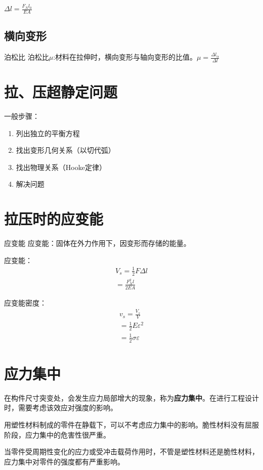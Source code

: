 $\Delta l=\frac{F_Nl_0}{EA}$

\subsection{横向变形}
\begin{mydefinition}{泊松比}
	泊松比$\mu$:材料在拉伸时，横向变形与轴向变形的比值。$\mu=\frac{\Delta l_{\alpha}}{\Delta l}$

\end{mydefinition}


\section{拉、压超静定问题}
一般步骤：
\begin{enumerate}
	\item 列出独立的平衡方程
	\item 找出变形几何关系（以切代弧）
	\item 找出物理关系（Hooke定律）
	\item 解决问题
\end{enumerate}

\section{拉压时的应变能}
\begin{mydefinition}{应变能}
	应变能：固体在外力作用下，因变形而存储的能量。
\end{mydefinition}
应变能：
\begin{align*}
	V_s=\frac{1}{2}F\Delta l\\
	=\frac{F_N^2l}{2EA}
\end{align*}

应变能密度：
\begin{align*}
	 v_s=\frac{V_s}{V}\\
	 =\frac{1}{2}E\varepsilon^2\\
	 =\frac{1}{2}\sigma \varepsilon
\end{align*}
\section{应力集中}
在构件尺寸突变处，会发生应力局部增大的现象，称为\textbf{应力集中}。在进行工程设计时，需要考虑该效应对强度的影响。

用塑性材料制成的零件在静载下，可以不考虑应力集中的影响。脆性材料没有屈服阶段，应力集中的危害性很严重。

当零件受周期性变化的应力或受冲击载荷作用时，不管是塑性材料还是脆性材料，应力集中对零件的强度都有严重影响。




